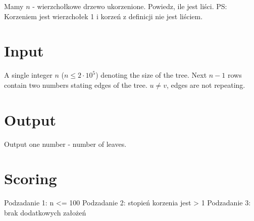 \documentclass{spiral}
\begin{document}
    \makeheader

    Mamy $n$  - wierzchołkowe drzewo ukorzenione. Powiedz, ile jest liści.
    PS: Korzeniem jest wierzchołek 1 i korzeń z definicji nie jest liściem.

\section{Input}

    A single integer $n$ ($n \leq 2 \cdot 10^5$) denoting the size of the tree.
    Next $n-1$ rows contain two numbers stating edges of the tree.
    $u \neq v$, edges are not repeating.

\section{Output}

    Output one number - number of leaves.


\section{Scoring}

    Podzadanie 1: n <= 100
    Podzadanie 2: stopień korzenia jest > 1
    Podzadanie 3: brak dodatkowych założeń
\end{document}
